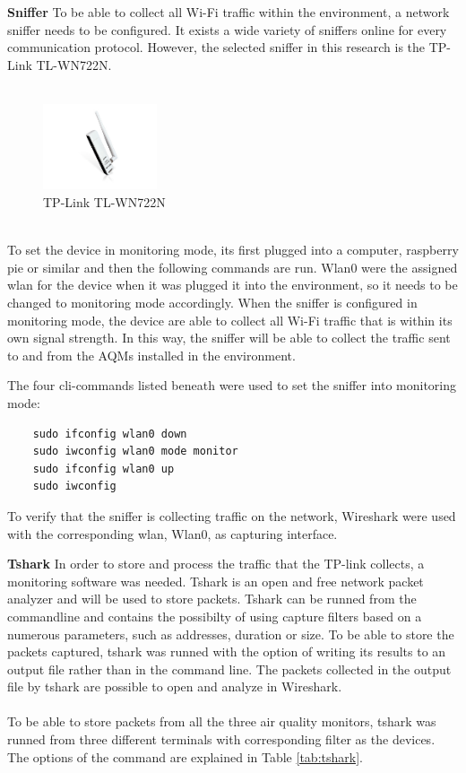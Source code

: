 \textbf{Sniffer}
To be able to collect all Wi-Fi traffic within the environment, a network sniffer needs to be configured. It exists a wide variety of sniffers online for every communication protocol. However, the selected sniffer in this research is the TP-Link TL-WN722N. 
\\\\
\begin{figure} [!ht]
    \centering
    \includegraphics[width=0.3\textwidth]{figures/Sniffer.jpg}
    \caption{TP-Link TL-WN722N \cite{Sniffer}}
    \label{fig:Sniffer}
\end{figure}
\\
To set the device in monitoring mode, its first plugged into a computer, raspberry pie or similar and then the following commands are run. Wlan0 were the assigned wlan for the device when it was plugged it into the environment, so it needs to be changed to monitoring mode accordingly. When the sniffer is configured in monitoring mode, the device are able to collect all Wi-Fi traffic that is within its own signal strength. In this way, the sniffer will be able to collect the traffic sent to and from the AQMs installed in the environment. 

The four cli-commands listed beneath were used to set the sniffer into monitoring mode:
\begin{verbatim}
    sudo ifconfig wlan0 down
    sudo iwconfig wlan0 mode monitor
    sudo ifconfig wlan0 up
    sudo iwconfig
\end{verbatim}
To verify that the sniffer is collecting traffic on the network, Wireshark were used with the corresponding wlan, Wlan0, as capturing interface. 

\textbf{Tshark}
In order to store and process the traffic that the TP-link collects, a monitoring software was needed. Tshark is an open and free network packet analyzer and will be used to store packets. Tshark can be runned from the commandline and contains the possibilty of using capture filters based on a numerous parameters, such as addresses, duration or size. To be able to store the packets captured, tshark was runned with the option of writing its results to an output file rather than in the command line. The packets collected in the output file by tshark are possible to open and analyze in Wireshark. 
\\\\
To be able to store packets from all the three air quality monitors, tshark was runned from three different terminals with corresponding filter as the devices. The options of the command are explained in Table \ref{tab:tshark}.

